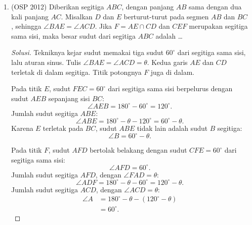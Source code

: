 \documentclass[12pt]{scrartcl}
\begin{document}
\begin{enumerate}[resume]
	\item (OSP 2012)
	Diberikan segitiga $ABC$, dengan panjang $AB$ sama dengan dua kali
	panjang $AC$. Misalkan $D$ dan $E$ berturut-turut pada segmen $AB$
	dan $BC$, sehingga $\angle BAE=\angle ACD$. Jika $F=AE \cap CD$ dan
	$CEF$ merupakan segitiga sama sisi, maka besar sudut dari segitiga
	$ABC$ adalah \dots
\begin{center}
\end{center}
	\begin{proof}[Solusi]
	Tekniknya kejar sudut memakai tiga sudut $60^\circ$ dari segitiga
	sama sisi, lalu aturan sinus. Tulis
	$\angle BAE = \angle ACD = \theta$.
	Kedua garis $AE$ dan $CD$ terletak di dalam segitiga.
	Titik potongnya $F$ juga di dalam.

	Pada titik $E$, sudut $FEC = 60^\circ$ dari segitiga sama sisi
	berpelurus dengan sudut $AEB$ sepanjang sisi $BC$:
	\[ \angle AEB = 180^\circ - 60^\circ = 120^\circ. \]
	Jumlah sudut segitiga $ABE$:
	\[ \angle ABE = 180^\circ - \theta - 120^\circ = 60^\circ - \theta. \]
	Karena $E$ terletak pada $BC$, sudut $ABE$ tidak lain adalah sudut $B$ segitiga:
	\[ \angle B = 60^\circ - \theta. \]

	Pada titik $F$, sudut $AFD$ bertolak belakang dengan sudut
	$CFE = 60^\circ$ dari segitiga sama sisi:
	\[ \angle AFD = 60^\circ. \]
	Jumlah sudut segitiga $AFD$, dengan $\angle FAD = \theta$:
	\[ \angle ADF = 180^\circ - \theta - 60^\circ = 120^\circ - \theta. \]
	Jumlah sudut segitiga $ACD$, dengan $\angle ACD = \theta$:
	\begin{align*}
	\angle A &= 180^\circ - \theta - (120^\circ - \theta) \\
	&= 60^\circ.
	\end{align*}


\end{proof}
\end{enumerate}
\end{document}
